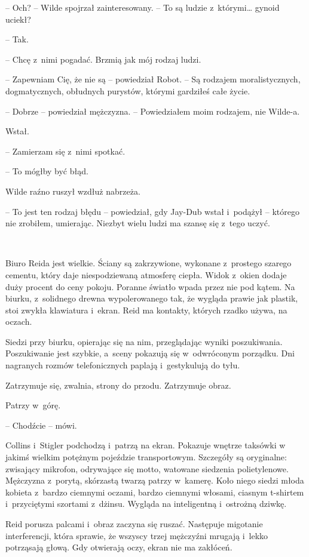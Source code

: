 \documentclass[oneside,polish,11pt,sfheadings]{mwbk}
\begin{document}
-- Och? -- Wilde spojrzał zainteresowany. -- To są ludzie z~którymi\ldots
gynoid uciekł?

-- Tak.

-- Chcę z~nimi pogadać. Brzmią jak mój rodzaj ludzi.

-- Zapewniam Cię, że nie są -- powiedział Robot. -- Są rodzajem
moralistycznych, dogmatycznych, obłudnych purystów, którymi gardziłeś
całe życie.

-- Dobrze -- powiedział mężczyzna. -- Powiedziałem moim rodzajem, nie
Wilde-a.

Wstał. 

-- Zamierzam się z~nimi spotkać.

-- To mógłby być błąd.

Wilde raźno ruszył wzdłuż nabrzeża. 

-- To jest ten rodzaj błędu -- powiedział, gdy Jay-Dub wstał i~podążył -- którego nie zrobiłem,
umierając. Niezbyt wielu ludzi ma szansę się z~tego uczyć.

~

Biuro Reida jest wielkie. Ściany są zakrzywione, wykonane z~prostego
szarego cementu, który daje niespodziewaną atmosferę ciepła. Widok z~okien dodaje duży procent do ceny pokoju. Poranne światło wpada przez
nie pod kątem. Na biurku, z~solidnego drewna wypolerowanego tak, że
wygląda prawie jak plastik, stoi zwykła klawiatura i~ekran. Reid ma
kontakty, których rzadko używa, na oczach.

Siedzi przy biurku, opierając się na nim, przeglądając wyniki
poszukiwania. Poszukiwanie jest szybkie, a~sceny pokazują się w~odwróconym porządku. Dni nagranych rozmów telefonicznych paplają i~gestykulują do tyłu.

Zatrzymuje się, zwalnia, strony do przodu. Zatrzymuje obraz.

Patrzy w~górę. 

-- Chodźcie -- mówi.

Collins i~Stigler podchodzą i~patrzą na ekran. Pokazuje wnętrze taksówki
w jakimś wielkim potężnym pojeździe transportowym. Szczegóły są
oryginalne: zwisający mikrofon, odrywające się motto, watowane siedzenia
polietylenowe. Mężczyzna z~porytą, skórzastą twarzą patrzy w~kamerę.
Koło niego siedzi młoda kobieta z~bardzo ciemnymi oczami, bardzo
ciemnymi włosami, ciasnym t-shirtem i~przyciętymi szortami z~dżinsu.
Wygląda na inteligentną i~ostrożną dziwkę.

Reid porusza palcami i~obraz zaczyna się ruszać. Następuje migotanie
interferencji, która sprawie, że wszyscy trzej mężczyźni mrugają i~lekko
potrząsają głową. Gdy otwierają oczy, ekran nie ma zakłóceń.
\end{document}
